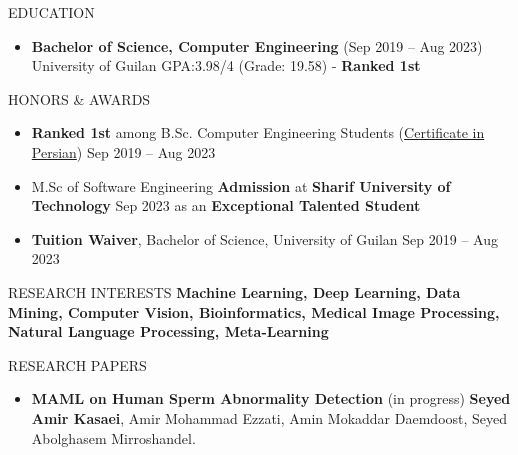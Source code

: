 \documentclass[]{CV}
\begin{document}
\resumeheader
{}
{}
{}
{}


\vspace{-4mm}
\begin{flushright}
\end{flushright}

\vspace{-7mm}
\begin{section}{EDUCATION}
\begin{itemize}
\item \textbf{Bachelor of Science, Computer Engineering} \hfill (Sep 2019 -- Aug 2023)\newline
{University of Guilan \newline GPA:3.98/4 (Grade: 19.58) - \textbf{Ranked 1st}}
\end{itemize}
\end{section}

\vspace{-2mm}
\begin{section}{HONORS \& AWARDS}
\begin{itemize}
\item \textbf{Ranked 1st} among B.Sc. Computer Engineering Students (\href{https://drive.google.com/file/d/1RfuN4xRnWvJ53gFADrlBrSxIEHqgPVWS/view?usp=sharing}{Certificate in Persian}) \hfill Sep 2019 -- Aug 2023 

\item M.Sc of Software Engineering \textbf{Admission} at \textbf{Sharif University of Technology} \hfill Sep 2023
\newline as an \textbf{Exceptional Talented Student} 

\item \textbf{Tuition Waiver}, Bachelor of Science, University of Guilan \hfill Sep 2019 -- Aug 2023 
\end{itemize}
\end{section}
\begin{section}{RESEARCH INTERESTS}
    \textbf{Machine Learning, Deep Learning, Data Mining, Computer Vision, Bioinformatics, Medical Image Processing, Natural Language Processing,  Meta-Learning}
\end{section}
\vspace{-2mm}
\begin{section}{RESEARCH PAPERS}
\begin{itemize}
\item \textbf{MAML on Human Sperm Abnormality Detection} \hfill (in progress)\newline
\textbf{Seyed Amir Kasaei}, Amir Mohammad  Ezzati, Amin Mokaddar Daemdoost, Seyed Abolghasem Mirroshandel.
\end{itemize}
\end{section}
\vspace{-2mm}
\end{document}
